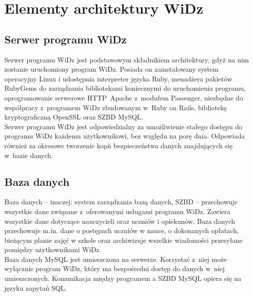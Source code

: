 \documentclass[12pt,leqno,twoside]{mwart}
\begin{document}
\section{Elementy architektury WiDz}
\subsection{Serwer programu WiDz}
\noindent Serwer programu WiDz jest podstawowym składnikiem architektury, gdyż na nim zostanie uruchomiony program WiDz. Posiada on zainstalowany system operacyjny Linux i udostępnia interpreter języka Ruby, menadżera pakietów RubyGems do zarządzania bibliotekami koniecznymi do uruchomienia programu, oprogramowanie serwerowe \hbox{HTTP Apache} z~modułem Passenger, niezbędne do współpracy z~programem WiDz zbudowanym w~Ruby on Rails, bibliotekę kryptograficzną OpenSSL oraz SZBD MySQL.\\
\indent Serwer programu WiDz jest odpowiedzialny za umożliwienie stałego dostępu do programu WiDz każdemu użytkownikowi, bez względu na porę dnia. Odpowiada również za okresowe tworzenie kopii bezpieczeństwa danych znajdujących się w~bazie danych. 

\subsection{Baza danych}
\noindent Baza danych -- inaczej: system zarządzania bazą danych, SZBD -- przechowuje wszystkie dane związane z~oferowanymi usługami programu WiDz. Zawiera wszystkie dane dotyczące nauczycieli oraz uczniów i opiekunów. Baza danych przechowuje m.in. dane o postępach uczniów w nauce, o dokonanych opłatach, bieżącym planie zajęć w szkole oraz archiwizuje wszelkie wiadomości przesyłane pomiędzy użytkownikami WiDz.\\
\indent Baza danych  MySQL jest umieszczona na serwerze. Korzystać z~niej może wyłącznie program WiDz, który ma bezpośredni dostęp do danych w~niej umieszczonych. Komunikacja między programem a SZBD MySQL opiera się na języku zapytań SQL.
\end{document}
